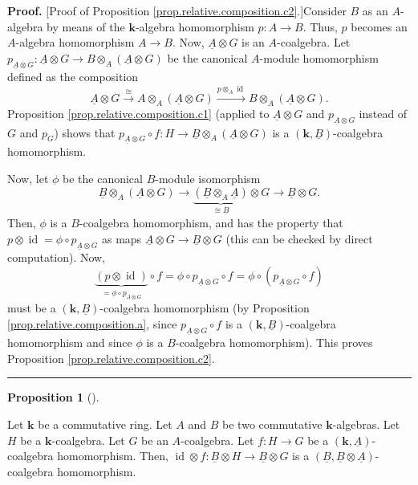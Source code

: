 \documentclass
[numbers=enddot,12pt,final,onecolumn,notitlepage,abstracton]{scrartcl}%
\theoremstyle{definition}
\newtheorem{prop}[theo]{Proposition}
\newenvironment{proposition}[1][]
{\begin{prop}[#1]\begin{leftbar}}
{\end{leftbar}\end{prop}}
\newenvironment{proof}[1][Proof]{\noindent\textbf{#1.} }{\ \rule{0.5em}{0.5em}}
\begin{document}
\begin{proof}
[Proof of Proposition \ref{prop.relative.composition.c2}.]Consider $B$ as an
$A$-algebra by means of the $\mathbf{k}$-algebra homomorphism $p:A\rightarrow
B$. Thus, $p$ becomes an $A$-algebra homomorphism $A\rightarrow B$. Now,
$\underline{A}\otimes G$ is an $A$-coalgebra. Let $p_{\underline{A}\otimes
G}:\underline{A}\otimes G\rightarrow B\otimes_{A}\left(  \underline{A}\otimes
G\right)  $ be the canonical $A$-module homomorphism defined as the
composition%
\[
\underline{A}\otimes G\overset{\cong}{\longrightarrow}A\otimes_{A}\left(
\underline{A}\otimes G\right)  \overset{p\otimes_{A}\operatorname*{id}%
}{\longrightarrow}B\otimes_{A}\left(  \underline{A}\otimes G\right)  .
\]
Proposition \ref{prop.relative.composition.c1} (applied to $\underline{A}%
\otimes G$ and $p_{\underline{A}\otimes G}$ instead of $G$ and $p_{G}$) shows
that $p_{\underline{A}\otimes G}\circ f:H\rightarrow\underline{B}\otimes
_{A}\left(  \underline{A}\otimes G\right)  $ is a $\left(  \mathbf{k}%
,\underline{B}\right)  $-coalgebra homomorphism.

Now, let $\phi$ be the canonical $B$-module isomorphism
\[
\underline{B}\otimes_{A}\left(  \underline{A}\otimes G\right)  \rightarrow
\underbrace{\left(  \underline{B}\otimes_{A}\underline{A}\right)  }%
_{\cong\underline{B}}\otimes G\rightarrow\underline{B}\otimes G.
\]
Then, $\phi$ is a $B$-coalgebra homomorphism, and has the property that
$p\otimes\operatorname*{id}=\phi\circ p_{\underline{A}\otimes G}$ as maps
$\underline{A}\otimes G\rightarrow\underline{B}\otimes G$ (this can be checked
by direct computation). Now,%
\[
\underbrace{\left(  p\otimes\operatorname*{id}\right)  }_{=\phi\circ
p_{\underline{A}\otimes G}}\circ f=\phi\circ p_{\underline{A}\otimes G}\circ
f=\phi\circ\left(  p_{\underline{A}\otimes G}\circ f\right)
\]
must be a $\left(  \mathbf{k},\underline{B}\right)  $-coalgebra homomorphism
(by Proposition \ref{prop.relative.composition.a}, since $p_{\underline{A}%
\otimes G}\circ f$ is a $\left(  \mathbf{k},\underline{B}\right)  $-coalgebra
homomorphism and since $\phi$ is a $B$-coalgebra homomorphism). This proves
Proposition \ref{prop.relative.composition.c2}.
\end{proof}

\begin{proposition}
\label{prop.relative.composition.d}Let $\mathbf{k}$ be a commutative ring. Let
$A$ and $B$ be two commutative $\mathbf{k}$-algebras. Let $H$ be a
$\mathbf{k}$-coalgebra. Let $G$ be an $A$-coalgebra. Let $f:H\rightarrow G$ be
a $\left(  \mathbf{k},\underline{A}\right)  $-coalgebra homomorphism. Then,
$\operatorname*{id}\otimes f:\underline{B}\otimes H\rightarrow\underline{B}%
\otimes G$ is a $\left(  \underline{B},\underline{B}\otimes\underline{A}%
\right)  $-coalgebra homomorphism.
\end{proposition}
\end{document}
